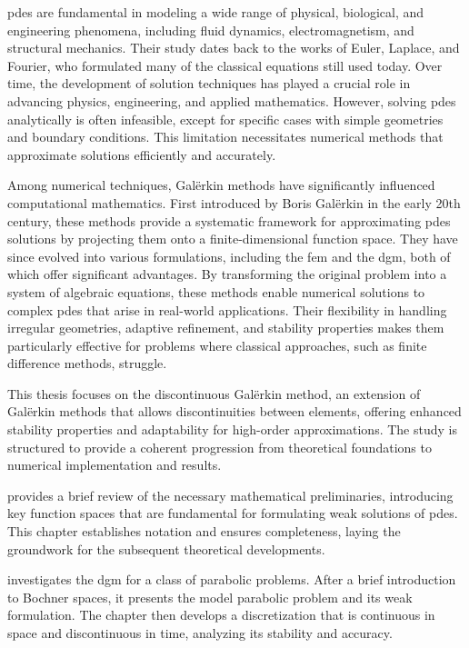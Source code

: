 \acrfull{pdes} are fundamental in modeling a wide range of physical, biological, and engineering phenomena, including fluid dynamics, electromagnetism, and structural mechanics. Their study dates back to the works of Euler, Laplace, and Fourier, who formulated many of the classical equations still used today. Over time, the development of solution techniques has played a crucial role in advancing physics, engineering, and applied mathematics. However, solving \acrshort{pdes} analytically is often infeasible, except for specific cases with simple geometries and boundary conditions. This limitation necessitates numerical methods that approximate solutions efficiently and accurately.

Among numerical techniques, Galërkin methods have significantly influenced computational mathematics. First introduced by Boris Galërkin in the early 20th century, these methods provide a systematic framework for approximating \acrshort{pdes} solutions by projecting them onto a finite-dimensional function space. They have since evolved into various formulations, including the \acrfull{fem} and the \acrfull{dgm}, both of which offer significant advantages. By transforming the original problem into a system of algebraic equations, these methods enable numerical solutions to complex \acrshort{pdes} that arise in real-world applications. Their flexibility in handling irregular geometries, adaptive refinement, and stability properties makes them particularly effective for problems where classical approaches, such as finite difference methods, struggle.

This thesis focuses on the discontinuous Galërkin method, an extension of Galërkin methods that allows discontinuities between elements, offering enhanced stability properties and adaptability for high-order approximations. The study is structured to provide a coherent progression from theoretical foundations to numerical implementation and results.

 provides a brief review of the necessary mathematical preliminaries, introducing key function spaces that are fundamental for formulating weak solutions of \acrshort{pdes}. This chapter establishes notation and ensures completeness, laying the groundwork for the subsequent theoretical developments.

 investigates the \acrshort{dgm} for a class of parabolic problems. After a brief introduction to Bochner spaces, it presents the model parabolic problem and its weak formulation. The chapter then develops a discretization that is continuous in space and discontinuous in time, analyzing its stability and accuracy.


